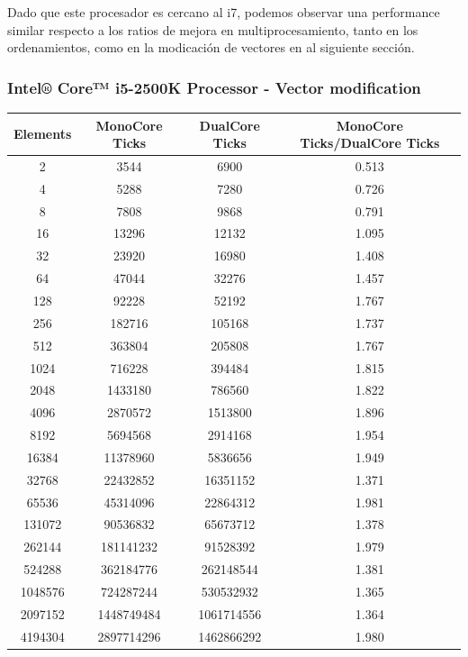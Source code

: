 	Dado que este procesador es cercano al i7, podemos observar una performance similar respecto a los ratios de mejora en multiprocesamiento, tanto en los ordenamientos, como en la modicación de vectores en al siguiente sección.

\subsubsection{Intel® Core™ i5-2500K Processor - Vector modification}
\begin{center}
	\begin{tabular}{|c|c|c|c|}
		\hline	
			Elements & MonoCore Ticks & DualCore Ticks & MonoCore Ticks/DualCore Ticks\\
		\hline
			2 & 3544 & 6900 & 0.513\\
		\hline
			4 & 5288 & 7280 & 0.726\\
		\hline
			8 & 7808 & 9868 & 0.791\\
		\hline
			16 & 13296 & 12132 & 1.095\\
		\hline
			32 & 23920 & 16980 & 1.408\\
		\hline
			64 & 47044 & 32276 & 1.457\\
		\hline
			128 & 92228 & 52192 & 1.767\\
		\hline
			256 & 182716 & 105168 & 1.737\\
		\hline
			512 & 363804 & 205808 & 1.767\\
		\hline
			1024 & 716228 & 394484 & 1.815\\
		\hline
			2048 & 1433180 & 786560 & 1.822\\
		\hline
			4096 & 2870572 & 1513800 & 1.896\\
		\hline
			8192 & 5694568 & 2914168 & 1.954\\
		\hline
			16384 & 11378960 & 5836656 & 1.949\\
		\hline
			32768 & 22432852 & 16351152 & 1.371\\
		\hline
			65536 & 45314096 & 22864312 & 1.981\\
		\hline
			131072 & 90536832 & 65673712 & 1.378\\
		\hline
			262144 & 181141232 & 91528392 & 1.979\\
		\hline
			524288 & 362184776 & 262148544 & 1.381\\
		\hline
			1048576 & 724287244 & 530532932 & 1.365\\
		\hline
			2097152 & 1448749484 & 1061714556 & 1.364\\
		\hline
			4194304 & 2897714296 & 1462866292 & 1.980\\
		\hline
	\end{tabular}
\end{center}

